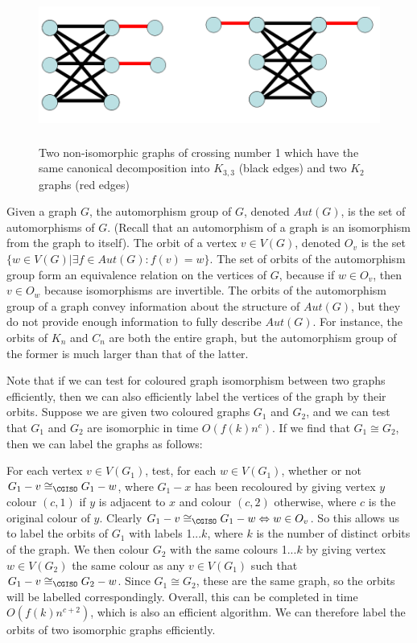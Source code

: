 \documentclass[11pt]{report}
\begin{document}
\begin{figure}[b]
\begin{center}
\leavevmode
\includegraphics[height=50mm]{NonIso_Same_Decomp_v0.png}
\end{center}
\caption{Two non-isomorphic graphs of crossing number 1 which have the same canonical decomposition into $K_{3,3}$ (black edges) and two $K_2$ graphs (red edges)}
\label{fig:crosnum_fail}
\end{figure}



Given a graph $G$, the automorphism group of $G$, denoted $Aut(G)$, is the set of automorphisms of $G$. (Recall that an automorphism of a graph is an isomorphism from the graph to itself). The orbit of a vertex $v\in V(G)$, denoted $O_v$  is the set $\{w \in V(G)| \exists f\in Aut(G) : f(v)=w\}$. The set of orbits of the automorphism group form an equivalence relation on the vertices of $G$, because if $w\in O_v$, then $v\in O_w$ because isomorphisms are invertible. The orbits of the automorphism group of a graph convey information about the structure of $Aut(G)$, but they do not provide enough information to fully describe $Aut(G)$. For instance, the orbits of $K_n$ and $C_n$ are both the entire graph, but the automorphism group of the former is much larger than that of the latter.

Note that if we can test for coloured graph isomorphism between two graphs efficiently, then we can also efficiently label the vertices of the graph by their orbits. Suppose we are given two coloured graphs $G_1$ and $G_2$, and we can test that $G_1$ and $G_2$ are isomorphic in time $O(f(k)n^c)$. If we find that $G_1 \cong G_2$, then we can label the graphs as follows: 

For each vertex $v\in V(G_1)$, test, for each $w\in V(G_1)$, whether or not $G_1 - v \cong_{\CGISO} G_1 - w$, where $G_1 - x$ has been recoloured by giving vertex $y$ colour $(c,1)$ if $y$ is adjacent to $x$ and colour $(c,2)$ otherwise, where $c$ is the original colour of $y$. Clearly $G_1 - v \cong_{\CGISO} G_1 - w \Leftrightarrow w\in O_v$. So this allows us to label the orbits of $G_1$ with labels 1...$k$, where $k$ is the number of distinct orbits of the graph. We then colour $G_2$ with the same colours 1...$k$ by giving vertex $w\in V(G_2)$ the same colour as any $v\in V(G_1)$ such that $G_1 - v \cong_{\CGISO} G_2 - w$. Since $G_1 \cong G_2$, these are the same graph, so the orbits will be labelled correspondingly. Overall, this can be completed in time $O(f(k)n^{c+2})$, which is also an efficient algorithm. We can therefore label the orbits of two isomorphic graphs efficiently. 
\end{document}

